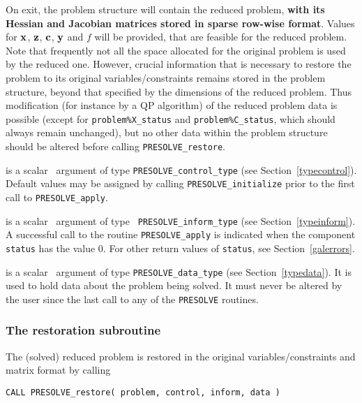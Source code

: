 \documentclass{galahad}
\newcommand{\packagename}{PRESOLVE}
\begin{document}
\begin{description}
\noindent
On exit, the problem structure will contain the reduced problem, {\bf with its
Hessian and Jacobian matrices stored in sparse row-wise format}. 
Values for ${\mathbf{x}}$, ${\mathbf{z}}$, ${\mathbf{c}}$, ${\mathbf{y}}$ and $f$ will be provided, that are
feasible for the reduced problem. Note that frequently not
all the space allocated for the original problem is used by the
reduced one.  However, crucial information that is necessary to restore the
problem to its original variables/constraints remains stored in the problem
structure, beyond that specified by the dimensions of the reduced problem.
Thus modification (for instance by a QP algorithm) of the reduced problem data 
is possible (except for {\tt problem\%X\_status} and {\tt problem\%C\_status},
which should always remain unchanged), but no other data within the problem
structure should be altered before calling {\tt \packagename\_restore}.

 is a scalar \intentinout\ argument of type 
{\tt \packagename\_control\_type}
(see Section~\ref{typecontrol}). Default values may be assigned by calling 
{\tt \packagename\_initialize} prior to the first call to 
{\tt \packagename\_apply}.

 is a scalar \intentinout\ argument of type {\tt
\packagename\_inform\_type} 
(see Section~\ref{typeinform}). A successful call to the routine
{\tt \packagename\_apply}
is indicated when the  component {\tt status} has the value 0. 
For other return values of {\tt status}, see Section~\ref{galerrors}.

 is a scalar \intentinout\ argument of type 
{\tt \packagename\_data\_type}
(see Section~\ref{typedata}). It is used to hold data about the problem being 
solved. It must never be  altered by the user since the last call to 
any of the {\tt \packagename} routines.

\end{description}


\subsubsection{The restoration subroutine}

The (solved) reduced problem is restored in the original variables/constraints
and matrix format by calling
\vspace*{1mm}

\hspace{8mm}
{\tt CALL \packagename\_restore( problem, control, inform, data )}
\vspace*{1mm}
\end{document}
